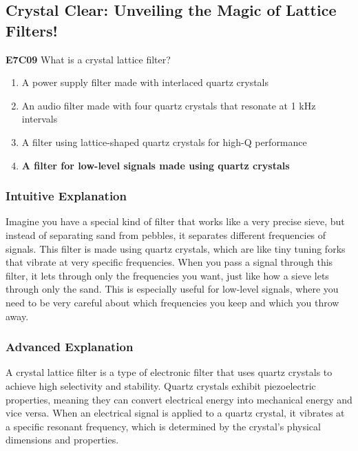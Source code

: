 \subsection{Crystal Clear: Unveiling the Magic of Lattice Filters!}

\begin{tcolorbox}[colback=blue!5!white,colframe=blue!75!black]
    \textbf{E7C09} What is a crystal lattice filter?
    
    \begin{enumerate}[label=\Alph*.]
        \item A power supply filter made with interlaced quartz crystals
        \item An audio filter made with four quartz crystals that resonate at 1 kHz intervals
        \item A filter using lattice-shaped quartz crystals for high-Q performance
        \item \textbf{A filter for low-level signals made using quartz crystals}
    \end{enumerate}
\end{tcolorbox}

\subsubsection{Intuitive Explanation}
Imagine you have a special kind of filter that works like a very precise sieve, but instead of separating sand from pebbles, it separates different frequencies of signals. This filter is made using quartz crystals, which are like tiny tuning forks that vibrate at very specific frequencies. When you pass a signal through this filter, it lets through only the frequencies you want, just like how a sieve lets through only the sand. This is especially useful for low-level signals, where you need to be very careful about which frequencies you keep and which you throw away.

\subsubsection{Advanced Explanation}
A crystal lattice filter is a type of electronic filter that uses quartz crystals to achieve high selectivity and stability. Quartz crystals exhibit piezoelectric properties, meaning they can convert electrical energy into mechanical energy and vice versa. When an electrical signal is applied to a quartz crystal, it vibrates at a specific resonant frequency, which is determined by the crystal's physical dimensions and properties.

